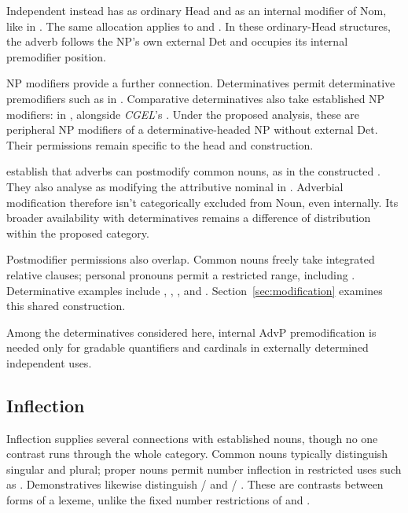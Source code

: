 \documentclass[12pt]{article}
\begin{document}
Independent  instead has  as ordinary Head and  as an internal modifier of Nom, like  in . The same allocation applies to  and . In these ordinary-Head structures, the adverb follows the NP's own external Det and occupies its internal premodifier position.

NP modifiers provide a further connection. Determinatives permit determinative premodifiers such as  in  \citep[393]{huddleston2002}. Comparative determinatives also take established NP modifiers:  in , alongside \textit{CGEL}'s  \citep[432]{huddleston2002}. Under the proposed analysis, these are peripheral NP modifiers of a determinative-headed NP without external Det. Their permissions remain specific to the head and construction.

\textcite[42--47]{payne2010} establish that adverbs can postmodify common nouns, as in the constructed . They also analyse  as modifying the attributive nominal  in  \citep[p.~75, n.~3]{payne2010}. Adverbial modification therefore isn't categorically excluded from Noun, even internally. Its broader availability with determinatives remains a difference of distribution within the proposed category.

Postmodifier permissions also overlap. Common nouns freely take integrated relative clauses; personal pronouns permit a restricted range, including  \citep[430]{huddleston2002}. Determinative examples include , , , and . Section~\ref{sec:modification} examines this shared construction.

Among the determinatives considered here, internal AdvP premodification is needed only for gradable quantifiers and cardinals in externally determined independent uses.

\subsection{Inflection}\label{sec:inflection}

Inflection supplies several connections with established nouns, though no one contrast runs through the whole category. Common nouns typically distinguish singular and plural; proper nouns permit number inflection in restricted uses such as . Demonstratives likewise distinguish / and / \citep[373, 521]{huddleston2002}. These are contrasts between forms of a lexeme, unlike the fixed number restrictions of  and .
\end{document}

